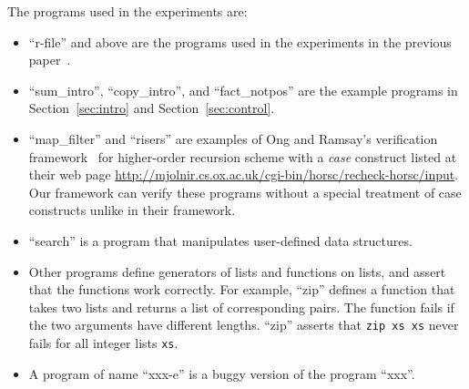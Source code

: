 The programs used in the experiments are:
\vspace{-5pt}
\begin{itemize}
\item ``r-file'' and above are the programs used in the experiments in
      the previous paper~\cite{KobayashiPLDI2011}.
\item ``sum\_intro'', ``copy\_intro'', and ``fact\_notpos'' are the example programs in
      Section~\ref{sec:intro} and Section~\ref{sec:control}.
\item ``map\_filter'' and ``risers'' are examples of Ong and
      Ramsay's verification framework~\cite{Ong2011} for higher-order
      recursion scheme with a \textit{case} construct listed at their
      web page
      \url{http://mjolnir.cs.ox.ac.uk/cgi-bin/horsc/recheck-horsc/input}.
      Our framework can verify these programs without a special
      treatment of case constructs unlike in their framework.
\item ``search'' is a program that manipulates user-defined data structures.
\item Other programs define generators of lists and functions on lists,
      and assert that the functions work correctly.  For example,
      ``zip'' defines a function that takes two lists and returns a list of corresponding pairs.
      The function fails if the two arguments have different lengths.
      ``zip'' asserts that \texttt{zip xs xs} never fails for all integer lists \texttt{xs}.
\item A program of name ``xxx-e'' is a buggy version of the program ``xxx''.
\end{itemize}
\vspace{-5pt}
